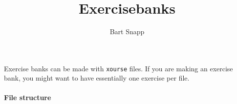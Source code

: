 \documentclass{ximera}
\title{Exercisebanks}
\author{Bart Snapp}
\begin{document}
\begin{abstract}
\end{abstract}
\maketitle



Exercise banks can be made with \verb!xourse! files. If you are making an
exercise bank, you might want to have essentially one exercise per file.

\paragraph{File structure}
\end{document}
